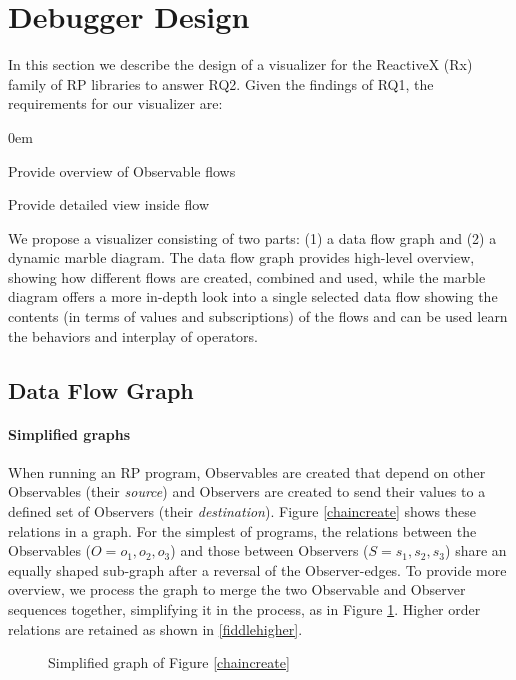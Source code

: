 \section{Debugger Design}
\label{section-design}
In this section we describe the design of a visualizer for the ReactiveX (Rx) family of RP libraries to answer RQ2. Given the findings of RQ1, the requirements for our visualizer are:
\begin{description}
\itemsep0em 
\item[REQ1] Provide overview of Observable flows
\item[REQ2] Provide detailed view inside flow
\end{description}

We propose a visualizer consisting of two parts: (1) a data flow graph and (2) a dynamic marble diagram. The data flow graph provides high-level overview, showing how different flows are created, combined and used, while the marble diagram offers a more in-depth look into a single selected data flow showing the contents (in terms of values and subscriptions) of the flows and can be used learn the behaviors and interplay of operators.

\subsection{Data Flow Graph}
\paragraph{Simplified graphs} When running an RP program, Observables are created that depend on other Observables (their \emph{source}) and Observers are created to send their values to a defined set of Observers (their \emph{destination}). Figure \ref{chaincreate} shows these relations in a graph. For the simplest of programs, the relations between the Observables ($O = {o_1, o_2, o_3}$) and those between Observers ($S = {s_1, s_2, s_3}$) share an equally shaped sub-graph after a reversal of the Observer-edges. To provide more overview, we process the graph to merge the two Observable and Observer sequences together, simplifying it in the process, as in Figure \ref{fiddlesimple}. Higher order relations are retained as shown in \ref{fiddlehigher}.

\begin{figure}[ht]
	\centering
	
	\caption{Simplified graph of Figure \ref{chaincreate}}
	\label{fiddlesimple}
\end{figure}

